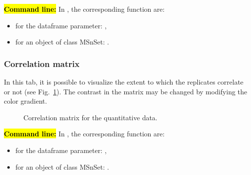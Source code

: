 \documentclass[12pt]{article}
\begin{document}
\hl{\bf Command line:} In , the corresponding function are:
\begin{itemize}
\item for the dataframe parameter: ,
\item for an object of class MSnSet: .
\end{itemize}

\subsubsection {Correlation matrix}

{In this tab, it is possible to visualize the extent to which the replicates 
correlate or not (see Fig.~\ref{fig:sdcm}). The contrast in the matrix may be 
changed by modifying the color gradient.}

\begin {figure}
\centering
{}
\caption{Correlation matrix for the quantitative data.}\label{fig:sdcm}
\end {figure}

\hl{\bf Command line:} In , the corresponding function are:
\begin{itemize}
\item for the dataframe parameter: ,
\item for an object of class MSnSet: .
\end{itemize}
\end{document}
